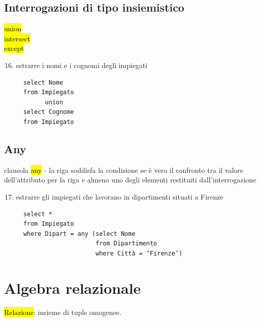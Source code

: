 \documentclass[a4paper]{article}
\begin{document}
\subsection{Interrogazioni di tipo insiemistico}
\hl{union}\\
\hl{intersect}\\
\hl{except}
\begin{enumerate}[leftmargin=*]
  \setcounter{enumi}{15}
  \item estrarre i nomi e i cognomi degli impiegati
  \begin{verbatim}
  select Nome
  from Impiegato
        union
  select Cognome
  from Impiegato
  \end{verbatim}
\end{enumerate}

\subsection{Any}
clausola \hl{any} - la riga soddisfa la condizione se è vero il confronto tra il valore dell’attributo per la riga e almeno uno degli elementi restituiti dall’interrogazione
\begin{enumerate}[leftmargin=*]
  \setcounter{enumi}{16}
  \item estrarre gli impiegati che lavorano in dipartimenti situati a Firenze
  \begin{verbatim}
  select *
  from Impiegato
  where Dipart = any (select Nome
                      from Dipartimento
                      where Città = ‘Firenze’)
  \end{verbatim}
\end{enumerate}


\section{Algebra relazionale}
\hl{Relazione}: insieme di tuple omogenee.
\end{document}
